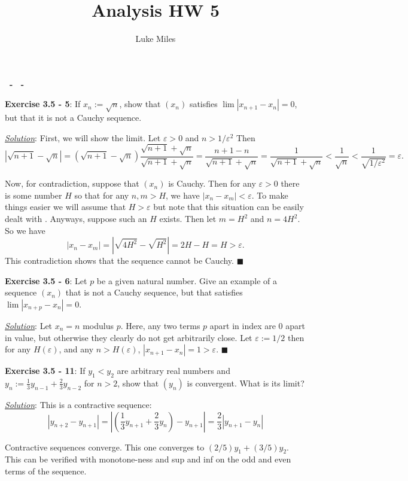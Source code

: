 \documentclass{article}
\title{Analysis HW 5}
\author{Luke Miles}
\begin{document}
\raggedright

\makeatletter
\textbf{\@title\ - \@author\ - \@date}
\makeatother

\hrulefill

\textbf{Exercise 3.5 - 5}: If $x_n:=\sqrt{n}$, show that $(x_n)$ satisfies
$\lim |x_{n+1}-x_n| = 0$, but that it is not a Cauchy sequence.

\underline{\textit{Solution}}: First, we will show the limit. Let
$\varepsilon > 0$ and $n > 1/\varepsilon^2$ Then
\[\left| \sqrt{n+1} - \sqrt{n} \right|
  = \left(\sqrt{n+1} - \sqrt{n}\right)
  \frac{\sqrt{n+1} + \sqrt{n}}{\sqrt{n+1} + \sqrt{n}}
  = \frac{n+1-n}{\sqrt{n+1} + \sqrt{n}}
  = \frac{1}{\sqrt{n+1} + \sqrt{n}}
  < \frac{1}{\sqrt{n}}
  < \frac{1}{\sqrt{1/\varepsilon^2}}
  = \varepsilon.
\]

Now, for contradiction, suppose that $(x_n)$ is Cauchy. Then for any
$\varepsilon > 0$ there is some number $H$ so that for any $n,m > H$,
we have $|x_n - x_m| < \varepsilon$. To make things easier we will
assume that $H > \varepsilon$ but note that this situation can be easily
dealt with . Anyways, suppose such an $H$ exists. Then let $m = H^2$ and
$n = 4H^2$. So we have
\[|x_n-x_m| = |\sqrt{4H^2}-\sqrt{H^2}| = 2H - H = H > \varepsilon.\]
This contradiction shows that the sequence cannot be Cauchy.
\hfill $\blacksquare$

\hrulefill

\textbf{Exercise 3.5 - 6}: Let $p$ be a given natural number. Give an
example of a sequence $(x_n)$ that is not a Cauchy sequence, but that
satisfies $\lim |x_{n+p} - x_n| = 0$.

\underline{\textit{Solution}}: Let $x_n = n$ modulus $p$. Here, any two
terms $p$ apart in index are 0 apart in value, but otherwise they clearly
do not get arbitrarily close. Let $\varepsilon := 1/2$ then for any
$H(\varepsilon)$, and any $n > H(\varepsilon)$,
$|x_{n+1}-x_n| = 1 > \varepsilon$. \hfill $\blacksquare$

\hrulefill

\textbf{Exercise 3.5 - 11}: If $y_1<y_2$ are arbitrary real numbers and
$y_n := \frac{1}{3}y_{n-1} + \frac{2}{3}y_{n-2}$ for $n>2$, show that
$(y_n)$ is convergent. What is its limit?

\underline{\textit{Solution}}: This is a contractive sequence:
\[|y_{n+2}-y_{n+1}|
  = \left| \left( \frac{1}{3}y_{n+1}+\frac{2}{3}y_n \right)
  - y_{n+1} \right|
  = \frac{2}{3} |y_{n+1}-y_n|
\]

Contractive sequences converge. This one converges to $(2/5)y_1+(3/5)y_2$.
This can be verified with monotone-ness and sup and inf on the odd and even
terms of the sequence.
\end{document}
